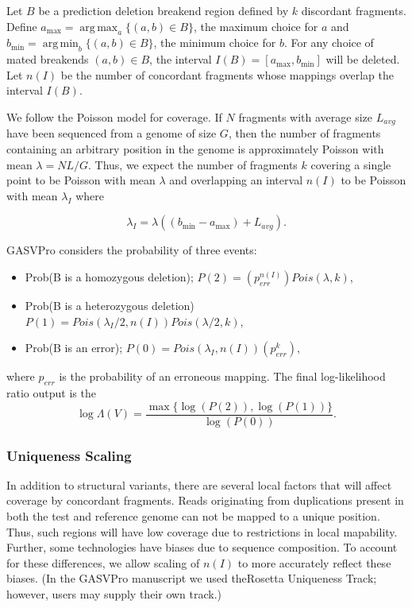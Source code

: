 \documentclass[11pt]{article}
\DeclareMathOperator*{\argmax}{arg\,max}
\DeclareMathOperator*{\argmin}{arg\,min}
\begin{document}
Let $B$ be a prediction deletion breakend region defined by $k$ discordant fragments.  Define $a_{\max} = \argmax_{a} \{(a,b) \in B\}$, the maximum choice for $a$ and $b_{\min} = \argmin_{b} \{(a,b) \in B\}$, the minimum choice for $b$. For any choice of mated breakends $(a,b) \in B$, the interval $I(B) = [a_{\max},b_{\min}]$ will be deleted.  Let $n(I)$ be the number of concordant fragments whose mappings overlap the interval $I(B)$.  

We follow the Poisson model for coverage. If $N$ fragments with average size $L_{avg}$ have been sequenced from a genome of size $G$, then the number of fragments containing an arbitrary position in the genome is approximately Poisson with mean $\lambda = NL/G$. Thus, we expect the number of fragments $k$ covering a single point to be Poisson with mean $\lambda$ and overlapping an interval $n(I)$ to be Poisson with mean $\lambda_{I}$ where

$$\lambda_{I} = \lambda( (b_{\min} - a_{\max}) + L_{avg}).$$

GASVPro considers the probability of three events: 
\begin{itemize}
\item Prob(B is a homozygous deletion); $P(2) = \left( p_{err}^{n(I)} \right) Pois(\lambda, k)$,
\item Prob(B is a heterozygous deletion) $P(1) = Pois\left(\lambda_I/2, n(I) \right) Pois(\lambda/2, k)$, 
\item Prob(B is an error); $P(0)  = Pois\left(\lambda_I, n(I) \right) \left( p_{err}^{k}\right),$
\end{itemize}

\noindent where $p_{err}$ is the probability of an erroneous mapping. The final log-likelihood ratio output is the 
\begin{equation}
\log \Lambda(V) = \frac{\max \{\log( P(2) ), \log(P(1)) \}}{ \log(P(0))}.
\end{equation}


\subsubsection{Uniqueness Scaling}
In addition to structural variants, there are several local factors that will affect coverage by concordant fragments. Reads originating from duplications present in both the test and reference genome can not be mapped to a unique position. Thus, such regions will have low coverage due to restrictions in local mapability. Further, some technologies have biases due to sequence composition. To account for these differences, we allow scaling of $n(I)$ to more accurately reflect these biases. (In the GASVPro manuscript we used theRosetta Uniqueness Track; however, users may supply their own track.) 
\end{document}
